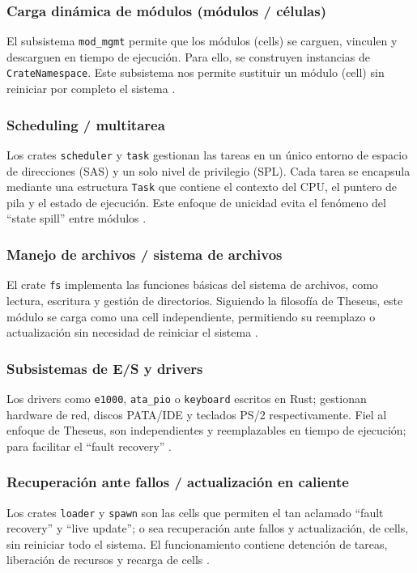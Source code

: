 \subsubsection*{Carga dinámica de módulos (módulos / células)}
El subsistema \texttt{mod\_mgmt} permite que los módulos (cells) se carguen, vinculen y descarguen en tiempo de ejecución. Para ello, se construyen instancias de \texttt{CrateNamespace}. Este subsistema nos permite sustituir un módulo (cell) sin reiniciar por completo el sistema \citep{theseus2023}.

\subsubsection*{Scheduling / multitarea}
Los crates \texttt{scheduler} y \texttt{task} gestionan las tareas en un único entorno de espacio de direcciones (SAS) y un solo nivel de privilegio (SPL). Cada tarea se encapsula mediante una estructura \texttt{Task} que contiene el contexto del CPU, el puntero de pila y el estado de ejecución. Este enfoque de unicidad evita el fenómeno del “state spill” entre módulos \citep{theseus_GitHub}.

\subsubsection*{Manejo de archivos / sistema de archivos}
El crate \texttt{fs} implementa las funciones básicas del sistema de archivos, como lectura, escritura y gestión de directorios. Siguiendo la filosofía de Theseus, este módulo se carga como una cell independiente, permitiendo su reemplazo o actualización sin necesidad de reiniciar el sistema \citep{theseus_GitHub}.

\subsubsection*{Subsistemas de E/S y drivers}
Los drivers como \texttt{e1000}, \texttt{ata\_pio} o \texttt{keyboard} escritos en Rust; gestionan hardware de red, discos PATA/IDE y teclados PS/2 respectivamente. Fiel al enfoque de Theseus, son independientes y reemplazables en tiempo de ejecución; para facilitar el “fault recovery”  \citep{theseus_GitHub}.

\subsubsection*{Recuperación ante fallos / actualización en caliente}
Los crates \texttt{loader} y \texttt{spawn} son las cells que permiten el tan aclamado “fault recovery” y “live update”; o sea recuperación ante fallos y actualización, de cells, sin reiniciar todo el sistema. El funcionamiento contiene detención de tareas, liberación de recursos y recarga de cells \citep{theseus2023}.

